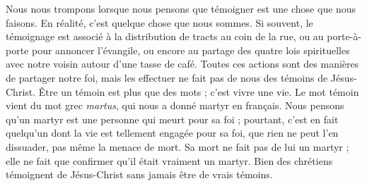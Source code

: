 Nous nous trompons lorsque nous pensons que témoigner
 est une chose que nous faisons.
 En réalité, c'est quelque chose que nous sommes.
 Si souvent, le témoignage est associé à la distribution de tracts
 au coin de la rue, ou au porte-à-porte pour annoncer l'évangile,
 ou encore au partage des quatre lois spirituelles avec notre voisin
 autour d'une tasse de café.
 Toutes ces actions sont des manières de partager notre foi,
 mais les effectuer ne fait pas de nous des témoins de Jésus-Christ.
 Être un témoin est plus que des mots ; c'est vivre une vie.
 Le mot \og témoin \fg{} vient du mot grec \emph{martus},
 qui nous a donné martyr en français.
 Nous pensons qu'un martyr est une personne qui meurt pour sa foi ;
 pourtant, c'est en fait quelqu'un dont la vie est tellement engagée
 pour sa foi, que rien ne peut l'en dissuader, pas même la menace de mort.
 Sa mort ne fait pas de lui un martyr ; elle ne fait que confirmer
 qu'il était vraiment un martyr.
 Bien des chrétiens témoignent de Jésus-Christ
 sans jamais être de vrais témoins.


